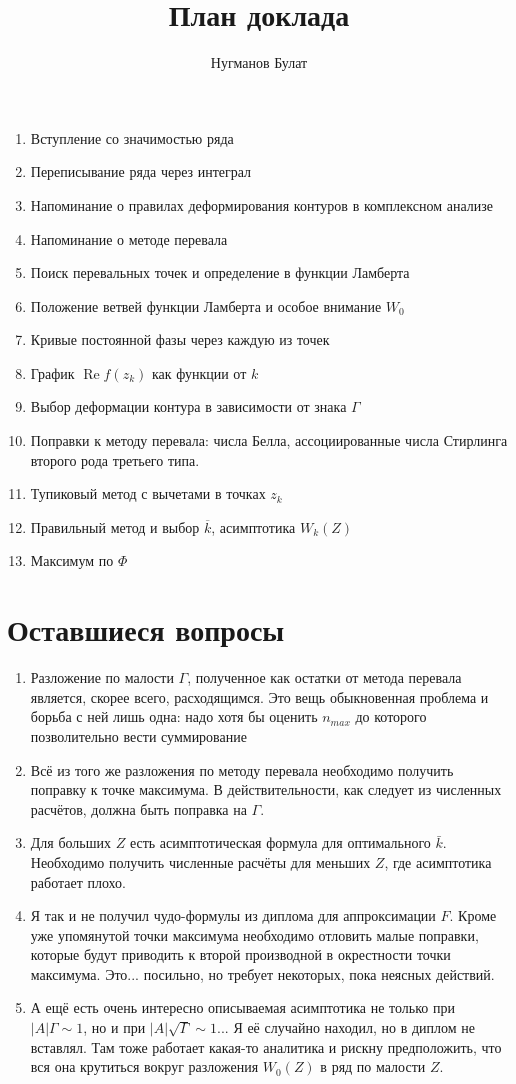 \documentclass[a4paper, 12pt]{article}
\author{Нугманов Булат}
\title{План доклада}
\DeclareMathOperator*{\Real}{Re}
\begin{document}
\maketitle
\begin{enumerate}
    \item Вступление со значимостью ряда
    \item Переписывание ряда через интеграл
    \item Напоминание о правилах деформирования контуров в комплексном анализе
    \item Напоминание о методе перевала
    \item Поиск перевальных точек и определение в функции Ламберта
    \item Положение ветвей функции Ламберта и особое внимание $W_0$
    \item Кривые постоянной фазы через каждую из точек
    \item График $\Real f(z_k)$ как функции от $k$
    \item Выбор деформации контура в зависимости от знака $\Gamma$
    \item Поправки к методу перевала: числа Белла, ассоциированные числа Стирлинга второго рода третьего типа.
    \item Тупиковый метод с вычетами в точках $z_k$
    \item Правильный метод и выбор $\overline{k}$, асимптотика $W_k(Z)$
    \item Максимум по $\Phi$
\end{enumerate}
\section*{Оставшиеся вопросы}
\begin{enumerate}
    \item Разложение по малости $\Gamma$, полученное как остатки от метода перевала является, скорее всего, расходящимся. Это вещь обыкновенная проблема и борьба с ней лишь одна: надо хотя бы оценить $n_{max}$ до которого позволительно вести суммирование
    \item Всё из того же разложения по методу перевала необходимо получить поправку к точке максимума. В действительности, как следует из численных расчётов, должна быть поправка на $\Gamma$.
    \item Для больших $Z$ есть асимптотическая формула для оптимального $\bar k$. Необходимо получить численные расчёты для меньших $Z$, где асимптотика работает плохо.
    \item Я так и не получил чудо-формулы из диплома для аппроксимации $F$. Кроме уже упомянутой точки максимума необходимо отловить малые поправки, которые будут приводить к второй производной в окрестности точки максимума. Это... посильно, но требует некоторых, пока неясных действий.
    \item А ещё есть очень интересно описываемая асимптотика не только при $|A|\Gamma\sim 1$, но и при $|A|\sqrt{\Gamma}\sim 1$... Я её случайно находил, но в диплом не вставлял. Там тоже работает какая-то аналитика и рискну предположить, что вся она крутиться вокруг разложения $W_0(Z)$ в ряд по малости $Z$. 
\end{enumerate}
\end{document}
